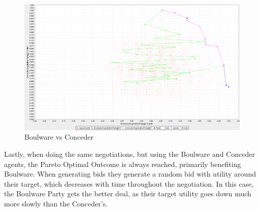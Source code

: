 \documentclass{article}
\begin{document}
\begin{enumerate}[label=(\alph*)]
\begin{figure}[ht]
  \includegraphics[width=.75\textwidth]{imgs/b_c}
  \centering
  \caption{Boulware vs Conceder}
\end{figure}
Lastly, when doing the same negotiations, but using the Boulware and Conceder agents, the Pareto Optimal Outcome is always reached, primarily benefiting Boulware. When generating bids they generate a random bid with utility around their target, which decreases with time throughout the negotiation. In this case, the Boulware Party gets the better deal, as their target utility goes down much more slowly than the Conceder's.

\end{enumerate} %
\end{document}
